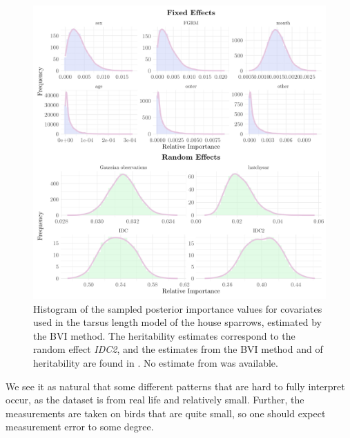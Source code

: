 \begin{figure}[H]
  \centering
  \includegraphics[width=1\linewidth]{Figures/House sparrow study/Tarsus_ccd.png}
  \caption[Estimated posterior importance of all covariates in the tarsus length model from the BVI method]{Histogram of the sampled posterior importance values for covariates used in the tarsus length model of the house sparrows, estimated by the BVI method. The heritability estimates correspond to the random effect \textit{IDC2}, and the estimates from the BVI method and \citet{Silva2017} of heritability are found in . No estimate from \citet{Muff2019Genetic} was available.}
  \label{fig:heritability_tarsus_combined}
\end{figure}
\noindent We see it as natural that some different patterns that are hard to fully interpret occur, as the dataset is from real life and relatively small. Further, the measurements are taken on birds that are quite small, so one should expect measurement error to some degree.

